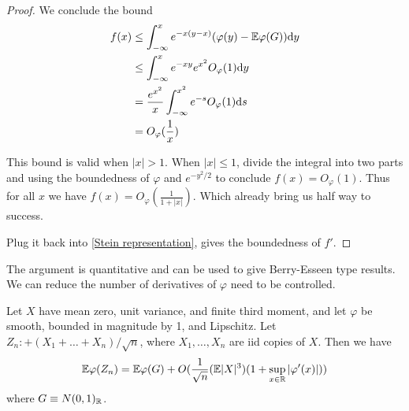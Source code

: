 \begin{proof}
    We conclude the bound 
    \begin{align*}
        f(x) & \leq \int^x_{-\infty} e^{-x(y-x)} (\varphi(y)-\mathbb{E} \varphi(G))\mathrm{d} y \\
             & \leq \int^x_{-\infty} e^{-xy}e^{x^2} O_\varphi(1)\mathrm{d} y \\
             & = \frac{e^{x^2}}{x}\int_{-\infty}^{x^2} e^{-s}O_\varphi(1)\mathrm{d} s \\
             & = O_\varphi (\frac{1}{x})
    \end{align*}

    This bound is valid when $|x|> 1$. When $|x|\leq 1$, divide the integral into two parts and using the boundedness of $\varphi$ and $e^{-y^2/2}$ to conclude $f(x) =O_\varphi(1)$. Thus for all $x$ we have $f(x)=O_\varphi(\frac{1}{1+|x|})$. Which already bring us half way to success.

    Plug it back into \ref{Stein representation}, gives the boundedness of $f'$.
\end{proof} 

The argument is quantitative and can be used to give Berry-Esseen type results. We can reduce the number of derivatives of $\varphi$ need to be controlled.

\begin{theorem}
    Let $X$ have mean zero, unit variance, and finite third moment, and let $\varphi$ be smooth, bounded in magnitude by 1, and Lipschitz. Let $Z_n:+(X_1+\dots+X_n)/\sqrt{n}$, where $X_1,\dots,X_n$ are iid copies of $X$. Then we have 
    \begin{equation}
        \mathbb{E} \varphi(Z_n) =\mathbb{E} \varphi(G) + O(\frac{1}{\sqrt{n}}(\mathbb{E} |X|^3)(1+\sup_{x\in \mathbb{R}} |\varphi'(x)|))
    \end{equation}
    where $G \equiv N(0,1)_{\mathbb{R}}$.
\end{theorem}

